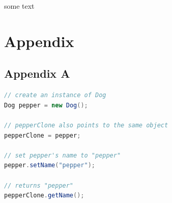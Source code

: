 \documentclass[fleqn,10pt]{SelfArx} %
\begin{document}
some text



\onecolumn
{}
\section*{Appendix} %


\appendix
\subsection*{Appendix A} \label{App:AppendixA}
\begin{lstlisting}[language=Java]
// create an instance of Dog
Dog pepper = new Dog();

// pepperClone also points to the same object
pepperClone = pepper;

// set pepper's name to "pepper"
pepper.setName("pepper");

// returns "pepper"
pepperClone.getName();

\end{lstlisting}

\end{document}
